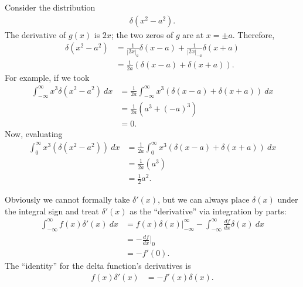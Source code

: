 \documentclass[10pt]{mypackage}
\begin{document}
\begin{example}
  Consider the distribution
  \begin{align*}
    \delta\!\left(x^2 - a^2\right).
  \end{align*}
  The derivative of $g(x)$ is $2x$; the two zeros of $g$ are at $x = \pm a$. Therefore,
  \begin{align*}
    \delta\!\left(x^2 - a^2\right) &= \frac{1}{\left\vert 2x \right\vert_{a}}\delta\!\left(x-a\right) + \frac{1}{\left\vert 2x \right\vert_{-a}}\delta\!\left(x+a\right)\\
                                 &= \frac{1}{2a}\left(\delta\!\left(x-a\right) + \delta\!\left(x+a\right)\right).
  \end{align*}
  For example, if we took
  \begin{align*}
    \int_{-\infty}^{\infty} x^3\delta\!\left(x^2 - a^2\right)\:dx &= \frac{1}{2a}\int_{-\infty}^{\infty} x^3\left(\delta\!\left(x-a\right) + \delta\!\left(x+a\right)\right)\:dx\\
                                                                &= \frac{1}{2a}\left(a^3 + \left(-a\right)^3\right)\\
                                                                &= 0.
  \end{align*}
  Now, evaluating
  \begin{align*}
    \int_{0}^{\infty} x^3\left(\delta\!\left(x^2 - a^2\right)\right)\:dx &= \frac{1}{2a}\int_{0}^{\infty} x^3\left(\delta\!\left(x-a\right) + \delta\!\left(x+a\right)\right)\:dx\\
                                                                       &= \frac{1}{2a}\left(a^3\right)\\
                                                                       &= \frac{1}{2}a^2.
  \end{align*}
\end{example}
\begin{example}
  Obviously we cannot formally take $\delta'(x)$, but we can always place $\delta(x)$ under the integral sign and treat $\delta'(x)$ as the ``derivative'' via integration by parts:
  \begin{align*}
    \int_{-\infty}^{\infty} f(x)\delta'(x)\:dx &= f(x)\delta(x)\bigr\vert_{-\infty}^{\infty} - \int_{-\infty}^{\infty} \frac{df}{dx}\delta(x)\:dx\\
                                               &= -\frac{df}{dx}\bigr\vert_{0}\\
                                               &= -f'(0).
  \end{align*}
  The ``identity'' for the delta function's derivatives is
  \begin{align*}
    f(x) \delta'(x) &= -f'(x)\delta(x).
  \end{align*}
\end{example}
\end{document}
